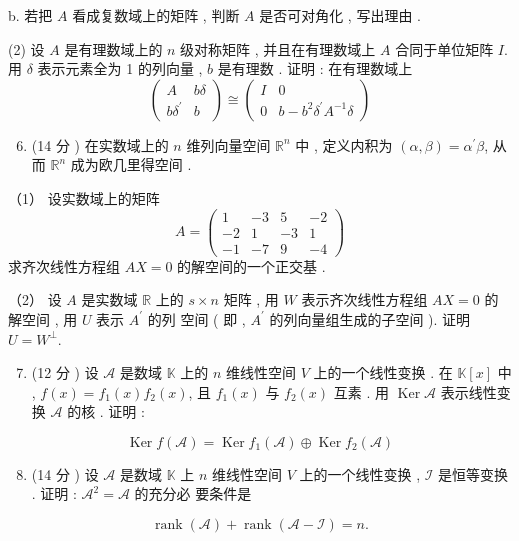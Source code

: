\documentclass[10pt]{article}
\begin{document}
b.  若把  $A$  看成复数域上的矩阵 ,  判断  $A$  是否可对角化 ,  写出理由 .

(2)  设  $A$  是有理数域上的  $n$  级对称矩阵 ,  并且在有理数域上  $A$  合同于单位矩阵  $I$.  用  $\delta$  表示元素全为  1  的列向量 , $b$  是有理数 .  证明 :  在有理数域上 
$$
\left(\begin{array}{cc}
A & b \delta \\
b \delta^{\prime} & b
\end{array}\right) \cong\left(\begin{array}{cc}
I & 0 \\
0 & b-b^{2} \delta^{\prime} A^{-1} \delta
\end{array}\right)
$$

\begin{enumerate}
  \setcounter{enumi}{5}
  \item (14  分 )  在实数域上的  $n$  维列向量空间  $\mathbb{R}^{n}$  中 ,  定义内积为  $(\alpha, \beta)=\alpha^{\prime} \beta$,  从而  $\mathbb{R}^{n}$  成为欧几里得空间 .
\end{enumerate}
（1） 设实数域上的矩阵 
$$
A=\left(\begin{array}{cccc}
1 & -3 & 5 & -2 \\
-2 & 1 & -3 & 1 \\
-1 & -7 & 9 & -4
\end{array}\right)
$$
 求齐次线性方程组  $A X=0$  的解空间的一个正交基 .

（2） 设  $A$  是实数域  $\mathbb{R}$  上的  $s \times n$  矩阵 ,  用  $W$  表示齐次线性方程组  $A X=0$  的解空间 ,  用  $U$  表示  $A^{\prime}$  的列   空间  ( 即 , $A^{\prime}$  的列向量组生成的子空间 ).  证明  $U=W^{\perp}$.

\begin{enumerate}
  \setcounter{enumi}{6}
  \item (12  分 )  设  $\mathscr{A}$  是数域  $\mathbb{K}$  上的  $n$  维线性空间  $V$  上的一个线性变换 .  在  $\mathbb{K}[x]$  中 , $f(x)=f_{1}(x) f_{2}(x)$,  且  $f_{1}(x)$  与  $f_{2}(x)$  互素 .  用  $\operatorname{Ker} \mathscr{A}$  表示线性变换  $\mathscr{A}$  的核 .  证明 :
\end{enumerate}
$$
\operatorname{Ker} f(\mathscr{A})=\operatorname{Ker} f_{1}(\mathscr{A}) \oplus \operatorname{Ker} f_{2}(\mathscr{A})
$$

\begin{enumerate}
  \setcounter{enumi}{7}
  \item (14  分 )  设  $\mathscr{A}$  是数域  $\mathbb{K}$  上  $n$  维线性空间  $V$  上的一个线性变换 , $\mathscr{I}$  是恒等变换 .  证明 : $\mathscr{A}^{2}=\mathscr{A}$  的充分必   要条件是 
\end{enumerate}
$$
\operatorname{rank}(\mathscr{A})+\operatorname{rank}(\mathscr{A}-\mathscr{I})=n .
$$
\end{document}

